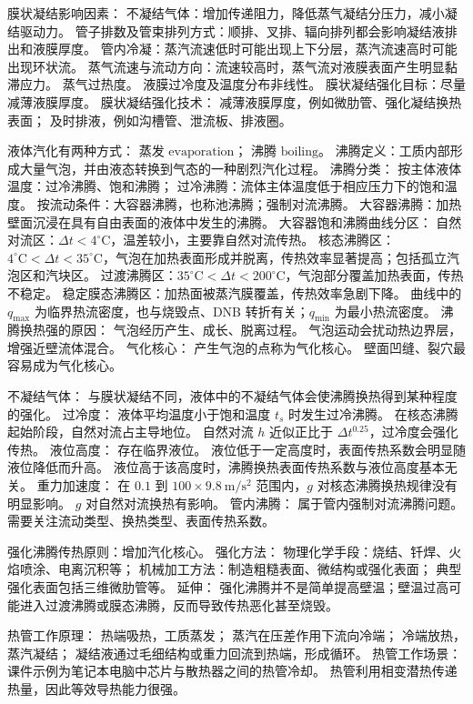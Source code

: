 
膜状凝结影响因素：
不凝结气体：增加传递阻力，降低蒸气凝结分压力，减小凝结驱动力。
管子排数及管束排列方式：顺排、叉排、辐向排列都会影响凝结液排出和液膜厚度。
管内冷凝：蒸汽流速低时可能出现上下分层，蒸汽流速高时可能出现环状流。
蒸气流速与流动方向：流速较高时，蒸气流对液膜表面产生明显黏滞应力。
蒸气过热度。
液膜过冷度及温度分布非线性。
膜状凝结强化目标：尽量减薄液膜厚度。
膜状凝结强化技术：
减薄液膜厚度，例如微肋管、强化凝结换热表面；
及时排液，例如沟槽管、泄流板、排液圈。


液体汽化有两种方式：
蒸发 $\mathrm{evaporation}$；
沸腾 $\mathrm{boiling}$。
沸腾定义：工质内部形成大量气泡，并由液态转换到气态的一种剧烈汽化过程。
沸腾分类：
按主体液体温度：过冷沸腾、饱和沸腾；
过冷沸腾：流体主体温度低于相应压力下的饱和温度。
按流动条件：大容器沸腾，也称池沸腾；强制对流沸腾。
大容器沸腾：加热壁面沉浸在具有自由表面的液体中发生的沸腾。
大容器饱和沸腾曲线分区：
自然对流区：$\Delta t<4^\circ\mathrm{C}$，温差较小，主要靠自然对流传热。
核态沸腾区：$4^\circ\mathrm{C}<\Delta t<35^\circ\mathrm{C}$，气泡在加热表面形成并脱离，传热效率显著提高；包括孤立汽泡区和汽块区。
过渡沸腾区：$35^\circ\mathrm{C}<\Delta t<200^\circ\mathrm{C}$，气泡部分覆盖加热表面，传热不稳定。
稳定膜态沸腾区：加热面被蒸汽膜覆盖，传热效率急剧下降。
曲线中的 $q_{\max}$ 为临界热流密度，也与烧毁点、DNB 转折有关；$q_{\min}$ 为最小热流密度。
沸腾换热强的原因：
气泡经历产生、成长、脱离过程。
气泡运动会扰动热边界层，增强近壁流体混合。
气化核心：
产生气泡的点称为气化核心。
壁面凹缝、裂穴最容易成为气化核心。


不凝结气体：
与膜状凝结不同，液体中的不凝结气体会使沸腾换热得到某种程度的强化。
过冷度：
液体平均温度小于饱和温度 $t_s$ 时发生过冷沸腾。
在核态沸腾起始阶段，自然对流占主导地位。
自然对流 $h$ 近似正比于 $\Delta t^{0.25}$，过冷度会强化传热。
液位高度：
存在临界液位。
液位低于一定高度时，表面传热系数会明显随液位降低而升高。
液位高于该高度时，沸腾换热表面传热系数与液位高度基本无关。
重力加速度：
在 $0.1$ 到 $100\times 9.8\ \mathrm{m/s^2}$ 范围内，$g$ 对核态沸腾换热规律没有明显影响。
$g$ 对自然对流换热有影响。
管内沸腾：
属于管内强制对流沸腾问题。
需要关注流动类型、换热类型、表面传热系数。


强化沸腾传热原则：增加汽化核心。
强化方法：
物理化学手段：烧结、钎焊、火焰喷涂、电离沉积等；
机械加工方法：制造粗糙表面、微结构或强化表面；
典型强化表面包括三维微肋管等。
延伸：
强化沸腾并不是简单提高壁温；壁温过高可能进入过渡沸腾或膜态沸腾，反而导致传热恶化甚至烧毁。


热管工作原理：
热端吸热，工质蒸发；
蒸汽在压差作用下流向冷端；
冷端放热，蒸汽凝结；
凝结液通过毛细结构或重力回流到热端，形成循环。
热管工作场景：
课件示例为笔记本电脑中芯片与散热器之间的热管冷却。
热管利用相变潜热传递热量，因此等效导热能力很强。

\divider